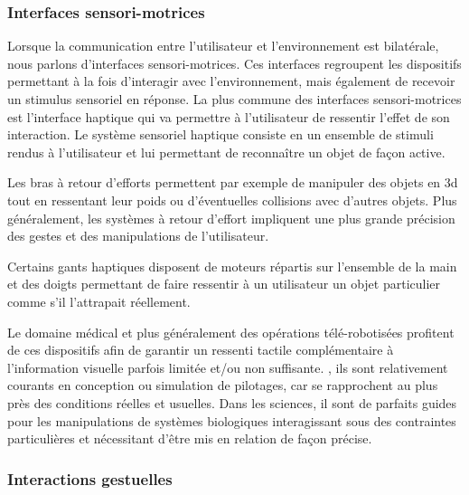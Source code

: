 \subsubsection{Interfaces sensori-motrices} \label{interface_sensor-motor}

Lorsque la communication entre l'utilisateur et l'environnement est bilatérale, nous parlons d'interfaces sensori-motrices. Ces interfaces regroupent les dispositifs permettant à la fois d'interagir avec l'environnement, mais également de recevoir un stimulus sensoriel en réponse. La plus commune des interfaces sensori-motrices est l'interface haptique qui va permettre à l'utilisateur de ressentir l'effet de son interaction. Le système sensoriel haptique consiste en un ensemble de stimuli rendus à l'utilisateur et lui permettant de reconnaître un objet de façon active. 

Les bras à retour d'efforts permettent par exemple de manipuler des objets en 3d tout en ressentant leur poids ou d'éventuelles collisions avec d'autres objets. Plus généralement, les systèmes à retour d'effort impliquent une plus grande précision des gestes et des manipulations de l'utilisateur.

Certains gants haptiques disposent de moteurs répartis sur l'ensemble de la main et des doigts permettant de faire ressentir à un utilisateur un objet particulier comme s'il l'attrapait réellement.

Le domaine médical et plus généralement des opérations télé-robotisées profitent de ces dispositifs afin de garantir un ressenti tactile complémentaire à l'information visuelle parfois limitée et/ou non suffisante. , ils sont relativement courants en conception ou simulation de pilotages, car se rapprochent au plus près des conditions réelles et usuelles.
Dans les sciences, il sont de parfaits guides pour les manipulations de systèmes biologiques interagissant sous des contraintes particulières et nécessitant d'être mis en relation de façon précise.

\subsubsection{Interactions gestuelles} \label{interface_nature}

